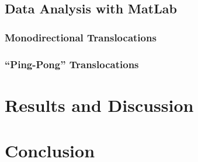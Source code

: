 \documentclass[aps,prl,preprint,groupedaddress]{revtex4}
\begin{document}
\subsection{Data Analysis with MatLab}



\subsubsection{Monodirectional Translocations}



\subsubsection{``Ping-Pong'' Translocations}



\section{Results and Discussion}



\section{Conclusion}



%


\end{document}
